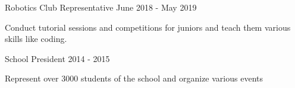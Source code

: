 

\begin{cventries}

  \projects
    {} %
    {Robotics Club Representative} %
    {June 2018 - May 2019} %
    {} %
    {
      \begin{por} %
        \item []{Conduct tutorial sessions and competitions for juniors and teach them various skills like coding. }
      \end{por}
    }

\projects
    {} %
    {School President} %
    {2014 - 2015} %
    {} %
    {
      \begin{por} %
        \item []{Represent over 3000 students of the school and organize various events}
      \end{por}
    }

\end{cventries}
